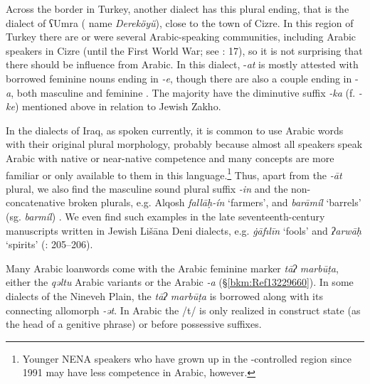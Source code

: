 \documentclass[output=paper]{langsci/langscibook}
\begin{document}
Across the border in Turkey, another  dialect has this plural ending, that is the dialect of ʕUmra ( name \textit{Dereköyü}), close to the town of Cizre. In this region of Turkey there are or were several Arabic-speaking communities, including  Arabic speakers in Cizre (until the First World War; see \citealt{Jastrow1978}: 17), so it is not surprising that there should be influence from Arabic. In this dialect, \nobreakdash-\textit{at} is mostly attested with borrowed feminine nouns ending in \textit{\nobreakdash-e}, though there are also a couple ending in \nobreakdash-\textit{a}, both masculine and feminine \citep[114]{Hobrack2000}. The majority have the  {diminutive} suffix \textit{\nobreakdash-ka} (f. \textit{\nobreakdash-ke}) mentioned above in relation to Jewish Zakho.

In the  dialects of Iraq, as spoken currently, it is common to use Arabic words with their original plural morphology, probably because almost all speakers speak Arabic with native or near-native competence and many concepts are more familiar or only available to them in this language.\footnote{Younger NENA speakers who have grown up in the -controlled region since 1991 may have less competence in Arabic, however.} Thus, apart from the \textit{\nobreakdash-āt} plural, we also find the masculine sound plural suffix \textit{{}-in} and the {non-concatenative} broken plurals, e.g.  Alqosh \textit{fallāḥ\nobreakdash-ín} ‘farmers’, and \textit{barāmíl} ‘barrels’ (sg. \textit{barmíl}) \citep[273]{Coghill2004}. We even find such examples in the late seventeenth-century manuscripts written in Jewish Lišāna Deni dialects, e.g. \textit{\.gāfılīn} ‘fools’ and \textit{ʔarwāḥ} ‘spirits’ (\citealt{Sabar1984}: 205–206).

Many Arabic {loanwords} come with the Arabic feminine marker \textit{tāʔ} \textit{marbūṭa}, either the \textit{qəltu} Arabic variants or the  Arabic \textit{\nobreakdash-a} (§\ref{bkm:Ref13229660}). In some dialects of the Nineveh Plain, the \textit{tāʔ} \textit{marbūṭa} is borrowed along with its connecting allomorph \textit{{}-ət}. In Arabic the /t/ is only realized in construct state (as the head of a genitive phrase) or before possessive suffixes.
\end{document}
